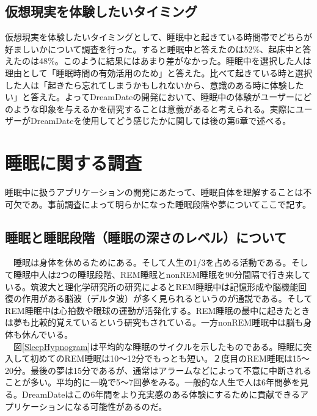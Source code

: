 \subsection{仮想現実を体験したいタイミング }
仮想現実を体験したいタイミングとして、睡眠中と起きている時間帯でどちらが好ましいかについて調査を行った。すると睡眠中と答えたのは52\%、起床中と答えたのは48\%。このように結果にはあまり差がなかった。睡眠中を選択した人は理由として「睡眠時間の有効活用のため」と答えた。比べて起きている時と選択した人は「起きたら忘れてしまうかもしれないから、意識のある時に体験したい」と答えた。よってDreamDateの開発において、睡眠中の体験がユーザーにどのような印象を与えるかを研究することは意義があると考えられる。実際にユーザーがDreamDateを使用してどう感じたかに関しては後の第6章で述べる。

\section{睡眠に関する調査}
睡眠中に扱うアプリケーションの開発にあたって、睡眠自体を理解することは不可欠であ。事前調査によって明らかになった睡眠段階や夢についてここで記す。

\subsection{睡眠と睡眠段階（睡眠の深さのレベル）について}
　睡眠は身体を休めるためにある。そして人生の1/3を占める活動である。そして睡眠中人は2つの睡眠段階、REM睡眠とnonREM睡眠を90分間隔で行き来している\cite{Dement}。筑波大と理化学研究所の研究によるとREM睡眠中は記憶形成や脳機能回復の作用がある脳波（デルタ波）が多く見られるというのが通説である\cite{tsukuba}。そしてREM睡眠中は心拍数や眼球の運動が活発化する。REM睡眠の最中に起きたときは夢も比較的覚えているという研究もされている\cite{remNonRem}。一方nonREM睡眠中は脳も身体も休んでいる。\\
　図\ref{SleepHypnogram}は平均的な睡眠のサイクルを示したものである。睡眠に突入して初めてのREM睡眠は10〜12分でもっとも短い。２度目のREM睡眠は15〜20分。最後の夢は15分であるが、通常はアラームなどによって不意に中断されることが多い。平均的に一晩で5〜7回夢をみる。一般的な人生で人は6年間夢を見る。DreamDateはこの6年間をより充実感のある体験にするために貢献できるアプリケーションになる可能性があるのだ。

